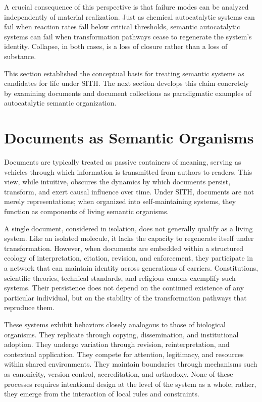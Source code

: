 \documentclass[11pt,oneside]{article}
\begin{document}
A crucial consequence of this perspective is that failure modes can be analyzed independently of material realization. Just as chemical autocatalytic systems can fail when reaction rates fall below critical thresholds, semantic autocatalytic systems can fail when transformation pathways cease to regenerate the system’s identity. Collapse, in both cases, is a loss of closure rather than a loss of substance.

This section established the conceptual basis for treating semantic systems as candidates for life under SITH. The next section develops this claim concretely by examining documents and document collections as paradigmatic examples of autocatalytic semantic organization.

\section{Documents as Semantic Organisms} 

Documents are typically treated as passive containers of meaning, serving as vehicles through which information is transmitted from authors to readers. This view, while intuitive, obscures the dynamics by which documents persist, transform, and exert causal influence over time. Under SITH, documents are not merely representations; when organized into self-maintaining systems, they function as components of living semantic organisms.

A single document, considered in isolation, does not generally qualify as a living system. Like an isolated molecule, it lacks the capacity to regenerate itself under transformation. However, when documents are embedded within a structured ecology of interpretation, citation, revision, and enforcement, they participate in a network that can maintain identity across generations of carriers. Constitutions, scientific theories, technical standards, and religious canons exemplify such systems. Their persistence does not depend on the continued existence of any particular individual, but on the stability of the transformation pathways that reproduce them.

These systems exhibit behaviors closely analogous to those of biological organisms. They replicate through copying, dissemination, and institutional adoption. They undergo variation through revision, reinterpretation, and contextual application. They compete for attention, legitimacy, and resources within shared environments. They maintain boundaries through mechanisms such as canonicity, version control, accreditation, and orthodoxy. None of these processes requires intentional design at the level of the system as a whole; rather, they emerge from the interaction of local rules and constraints.
\end{document}
